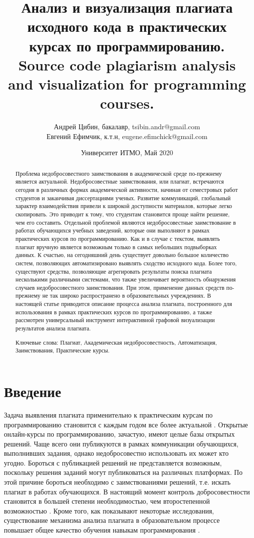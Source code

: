 \documentclass[a4paper,14pt]{extarticle}
\title{Анализ и визуализация плагиата исходного кода в практических курсах по программированию. Source code plagiarism analysis and visualization for programming courses.}
\author{Андрей Цибин, бакалавр, tsibin.andr@gmail.com\\Евгений Ефимчик, к.т.н, eugene.efimchick@gmail.com}
\date{Университет ИТМО, Май 2020}
\begin{document}
\maketitle

\begin{abstract}

Проблема недобросовестного заимствования в академической среде по-прежнему
является актуальной. Недобросовестные заимствования, или плагиат, встречаются сегодня в различных формах академической активности, начиная от семестровых работ студентов и заканчивая диссертациями ученых. Развитие коммуникаций, глобальный характер взаимодействия привели к широкой доступности материалов, которые легко скопировать. Это приводит к тому, что студентам становится проще найти решение, чем его составить. Отдельной проблемой
являются недобросовестные заимствование в работах обучающихся учебных заведений, которые они выполняют в рамках практических курсов по программированию. Как и в случае с текстом, выявлять плагиат вручную является возможным только в самых небольших подвыборках данных. К счастью, на сегодняшний день существует довольно большое количество систем, позволяющих
автоматизировано выявлять сходство исходного кода. Более того, существуют
средства, позволяющие агрегировать результаты поиска плагиата несколькими
различными системами, что также увеличивает вероятность обнаружения случаев недобросовестного заимствования. При этом, применение данных средств
по-прежнему не так широко распространено в образовательных учреждениях.
В настоящей статье приводится описание процесса анализа плагиата, построенного для использования в рамках практических курсов по программированию, а также рассмотрен универсальный инструмент интерактивной графовой визуализации результатов анализа плагиата.

Ключевые слова: Плагиат, Академическая недобросовестность, Автоматизация, Заимствования, Практические курсы.

\end{abstract}

\section{Введение}

Задача выявления плагиата применительно к практическим курсам по программированию становится с каждым годом все более актуальной \citep{plagiarismEpidemic}. Открытые онлайн-курсы по программированию, зачастую, имеют целые базы открытых решений. Чаще всего они публикуются в рамках коммуникации обучающихся,  выполнивших задания, однако недобросовестно использовать их может кто угодно. Бороться с публикацией решений не представляется возможным, поскольку решения заданий могут публиковаться на различных платформах. По этой причине бороться необходимо с заимствованиями решений, т.е. искать плагиат в работах обучающихся. В настоящий момент контроль добросовестности становится в большей степени необходимостью, чем второстепенной возможностью \citep{sciencePlagiarismPaper}. Кроме того, как показывают некоторые исследования, существование механизма анализа плагиата в образовательном процессе повышает общее качество обучения навыкам программирования \citep{plagCheckEffect}\citep{plagInterventionEffect}.
\end{document}
